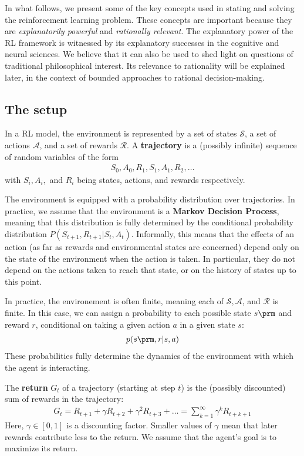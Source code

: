 \documentclass{my-tufte}
\begin{document}
In what follows, we present some of the key concepts used in stating and solving the reinforcement learning problem.
These concepts are important because they are \emph{explanatorily powerful} and \emph{rationally relevant}.
The explanatory power of the RL framework is witnessed by its explanatory successes in the cognitive and neural sciences.
We believe that it can also be used to shed light on questions of traditional philosophical interest.
Its relevance to rationality will be explained later, in the context of bounded approaches to rational decision-making.

\subsection{The setup}

In a RL model, the environment is represented by a set of states $\mathcal S$, a set of actions $\mathcal A$, and a set of rewards $\mathcal R$.
A \textbf{trajectory} is a (possibly infinite) sequence of random variables of the form
\begin{align*}
	S_0, A_0, R_1, S_1, A_1, R_2, \dots
\end{align*}
with $S_i, A_i,$ and $R_i$ being states, actions, and rewards respectively.

The environment is equipped with a probability distribution over trajectories.
In practice, we assume that the environment is a \textbf{Markov Decision Process}, meaning that this distribution is fully determined by the conditional probability distribution $P(S_{t+1}, R_{t+1} | S_t, A_t)$.
Informally, this means that the effects of an action (as far as rewards and environmental states are concerned) depend only on the state of the environment when the action is taken.
In particular, they do not depend on the actions taken to reach that state, or on the history of states up to this point.

In practice, the environement is often finite, meaning each of $\mathcal S, \mathcal A$, and $\mathcal R$ is finite.
In this case, we can assign a probability to each possible state $s\prm$ and reward $r$, conditional on taking a given action $a$ in a given state $s$:
\begin{align*}
	p(s\prm, r | s, a)
\end{align*}
These probabilities fully determine the dynamics of the environment with which the agent is interacting.

The \textbf{return} $G_t$ of a trajectory (starting at step $t$) is the (possibly discounted) sum of rewards in the trajectory:
\begin{align*}
	G_t = R_{t+1} + \gamma R_{t+2} + \gamma^2 R_{t+3} + \dots = \sum_{k=1}^\infty \gamma^k R_{t + k + 1}
\end{align*}
Here, $\gamma \in [0, 1]$ is a discounting factor.
Smaller values of $\gamma$ mean that later rewards contribute less to the return.
We assume that the agent's goal is to maximize its return.
\end{document}
